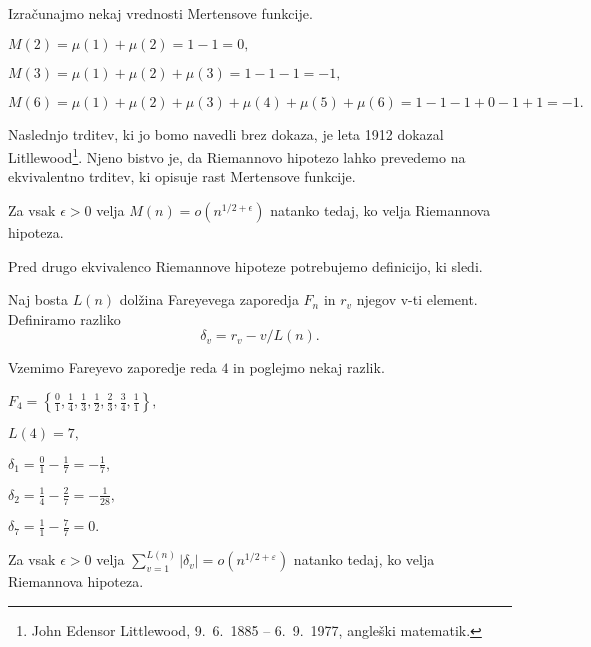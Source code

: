 \documentclass[mat1]{fmfdelo}
\begin{document}
\begin{primer}
Izračunajmo nekaj vrednosti Mertensove funkcije.

\( M(2) = \mu(1) + \mu(2) = 1 - 1 = 0, \)

\( M(3) = \mu(1) + \mu(2) + \mu(3) = 1 - 1 - 1 = -1, \)

\( M(6) = \mu(1) + \mu(2) + \mu(3) + \mu(4) + \mu(5) + \mu(6) = 1 - 1 - 1 + 0 - 1 + 1 = -1. \)
\end{primer}

Naslednjo trditev, ki jo bomo navedli brez dokaza, je leta 1912 dokazal Litllewood\footnote{John Edensor Littlewood, 9.\ 6.\ 1885 -- 6.\ 9.\ 1977, angleški matematik.}. Njeno bistvo je, da Riemannovo hipotezo lahko prevedemo na ekvivalentno trditev, ki opisuje rast Mertensove funkcije. 

\begin{trditev}
Za vsak $\epsilon>0$ velja \( M(n) = o(n^{1/2+\epsilon}) \) natanko tedaj, ko velja Riemannova hipoteza.
\end{trditev}

Pred drugo ekvivalenco Riemannove hipoteze potrebujemo definicijo, ki sledi.

\begin{definicija}
Naj bosta $L(n)$ dolžina Fareyevega zaporedja $F_{n}$ in $r_{v}$ njegov v-ti element. Definiramo razliko
\begin{equation}
\delta_{v}= r_{v}-v/L(n).
\end{equation}
\end{definicija}

\begin{primer}
Vzemimo Fareyevo zaporedje reda $4$ in poglejmo nekaj razlik. 

\(F_4 = \left \{\frac{0}{1}, \frac{1}{4}, \frac{1}{3}, \frac{1}{2}, \frac{2}{3}, \frac{3}{4}, \frac{1}{1} \right \}, \)

\( L(4) = 7, \)

\( \delta_{1}= \frac{0}{1} - \frac{1}{7} = -\frac{1}{7}, \)

\( \delta_{2}= \frac{1}{4} - \frac{2}{7} = -\frac{1}{28}, \)

\( \delta_{7}= \frac{1}{1} - \frac{7}{7} = 0. \)
\end{primer}

\begin{trditev}
Za vsak $\epsilon>0$ velja \( \sum_{v=1}^{L(n)}|\delta_{v}| = o(n^{1/2+\varepsilon}) \) natanko tedaj, ko velja Riemannova hipoteza.
\end{trditev}
\end{document}
